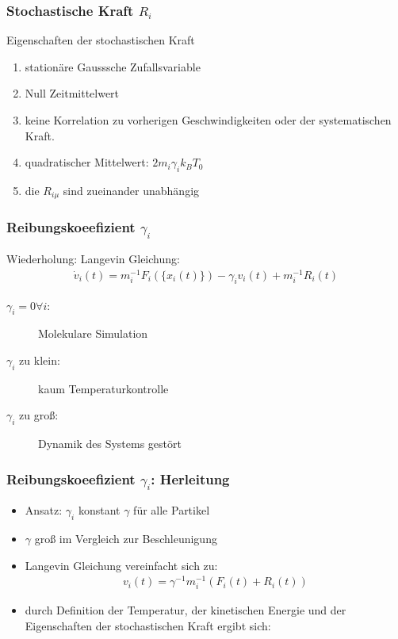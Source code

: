 \documentclass{beamer}
\begin{document}
\begin{frame}
  \frametitle{Stochastische Kraft $R_i$}
  \begin{block}{Eigenschaften der stochastischen Kraft} 
  	\begin{enumerate}
  		\item stationäre Gausssche Zufallsvariable
  		\item Null Zeitmittelwert %
  		\item keine Korrelation zu vorherigen Geschwindigkeiten oder der systematischen Kraft. 
  		\item quadratischer Mittelwert: $2 m_i \gamma_i k_B T_0$
  		\item die $R_{i \mu}$ sind zueinander unabhängig
  	\end{enumerate}
  \end{block}	
  
  
\end{frame}


\begin{frame}
	\frametitle{Reibungskoeefizient $\gamma_i$}
	Wiederholung: Langevin Gleichung:
	\begin{align*}
		\dot{v}_i(t)  = m_i^{-1} F_i(\{x_i(t)\}) - \gamma_i v_i(t) + m_i^{-1} R_i(t)
	\end{align*}
	\hspace{2em}
	
	\begin{description}
		\item[$\gamma_i=0 \forall i$:] Molekulare Simulation
		\item[$\gamma_i$ zu klein:] kaum Temperaturkontrolle
		\item[$\gamma_i$ zu groß:] Dynamik des Systems gestört 
	\end{description}
\end{frame}


\begin{frame}
	\frametitle{Reibungskoeefizient $\gamma_i$: Herleitung}
	\begin{itemize}
	    \item Ansatz: $\gamma_i$ konstant $\gamma$ für alle Partikel
	    \item $\gamma$ groß im Vergleich zur Beschleunigung
	    \item Langevin Gleichung vereinfacht sich zu:
	    \begin{align*}
	    v_i(t) = \gamma^{-1} m_i^{-1} (F_i(t) + R_i(t) )
	    \end{align*}
	    \item durch Definition der Temperatur, der kinetischen Energie und der Eigenschaften der stochastischen Kraft ergibt sich: 
	     
	\end{itemize}
    	
\end{frame}
\end{document}
